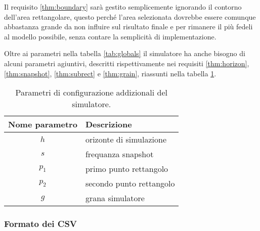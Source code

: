 \documentclass[draft]{article}
\newcommand{\eng}[1]{\foreignlanguage{english}{#1}} %
\begin{document}
Il requisito \ref{thm:boundary} sarà gestito semplicemente ignorando il contorno
dell'area rettangolare, questo perché l'area selezionata dovrebbe essere
comunque abbastanza grande da non influire sul risultato finale e per rimanere
il più fedeli al modello possibile, senza contare la semplicità di
implementazione.


Oltre ai parametri nella tabella \ref{tab:globals} il simulatore ha anche
bisogno di alcuni parametri agiuntivi, descritti rispettivamente nei requisiti
\ref{thm:horizon}, \ref{thm:snapshot}, \ref{thm:subrect} e \ref{thm:grain},
riassunti nella tabella \ref{tab:config}.

\begin{table}
\centering
\begin{tabular}{|c|l|}
	\hline
	\textbf{Nome parametro} & \textbf{Descrizione}\\
	\hline
	$h$ & orizonte di simulazione\\
	$s$ & frequanza \eng{snapshot}\\
	$p_1$ & primo punto rettangolo\\
	$p_2$ & secondo punto rettangolo\\
	$g$ & grana simulatore\\
	\hline
\end{tabular}
\caption{Parametri di configurazione addizionali del simulatore.}
\label{tab:config}
\end{table}


\vspace{0.5cm}{\huge -- Da qua in poi è tutto da riscrivere --}

\noindent\hrulefill %


\subsubsection{Formato dei CSV}

\end{document}
